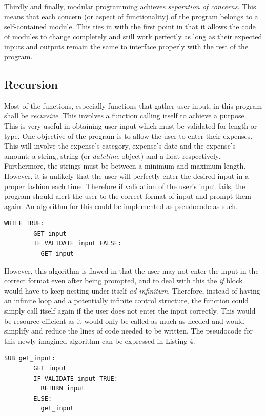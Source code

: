 \documentclass[11pt]{article}
\begin{document}
  Thirdly and finally, modular programming achieves \textit{separation of concerns}. This means that each concern (or aspect of functionality) of the program belongs to a self-contained module. This ties in with the first point in that it allows the code of modules to change completely and still work perfectly as long as their expected inputs and outputs remain the same to interface properly with the rest of the program.
  \subsection{Recursion}
  Most of the functions, especially functions that gather user input, in this program shall be \textit{recursive}. This involves a function calling itself to achieve a purpose. This is very useful in obtaining user input which must be validated for length or type. One objective of the program is to allow the user to enter their expenses. This will involve the expense's category, expense's date and the expense's amount; a string, string (or \textit{datetime} object) and a float respectively. Furthermore, the strings must be between a minimum and maximum length. However, it is unlikely that the user will perfectly enter the desired input in a proper fashion each time. Therefore if validation of the user's input fails, the program should alert the user to the correct format of input and prompt them again.
  An algorithm for this could be implemented as pseudocode as such.
    \begin{lstlisting}[caption=An example pseudocode algorithm to inefficiently obtain valid user input, captionpos=b]
      WHILE TRUE:
        GET input
        IF VALIDATE input FALSE:
          GET input
    \end{lstlisting}

  However, this algorithm is flawed in that the user may not enter the input in the correct format even after being prompted, and to deal with this the \textit{if} block would have to keep nesting under itself \textit{ad infinitum}.
  Therefore, instead of having an infinite loop and a potentially infinite control structure, the function could simply call itself again if the user does not enter the input correctly. This would be resource efficient as it would only be called as much as needed and would simplify and reduce the lines of code needed to be written.
  The pseudocode for this newly imagined algorithm can be expressed in Listing 4.
    \begin{lstlisting}[caption=A correct\, recursive algorithm to obtain valid user input, captionpos=b]
      SUB get_input:
        GET input
        IF VALIDATE input TRUE:
          RETURN input
        ELSE:
          get_input
    \end{lstlisting}
\end{document}
